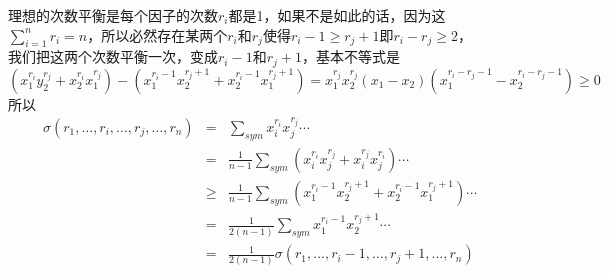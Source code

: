 \begin{example}[均值不等式]
  理想的次数平衡是每个因子的次数$r_i$都是1，如果不是如此的话，因为这$\sum_{i=1}^nr_i=n$，所以必然存在某两个$r_i$和$r_j$使得$r_i-1 \geqslant r_j+1$即$r_i - r_j \geqslant 2$，\\
  我们把这两个次数平衡一次，变成$r_i-1$和$r_j+1$，基本不等式是
  \begin{equation*}
  (x_1^{r_i}y_2^{r_j}+x_2^{r_i}x_1^{r_j})-(x_1^{r_i-1}x_2^{r_j+1}+x_2^{r_i-1}x_1^{r_j+1})=x_1^{r_j}x_2^{r_j}(x_1-x_2)(x_1^{r_i-r_j-1}-x_2^{r_i-r_j-1}) \geqslant 0
  \end{equation*}
  所以
  \begin{eqnarray*}
    \sigma(r_1,\ldots,r_i,\ldots,r_j,\ldots,r_n) & = & \sum_{sym}x_i^{r_i}x_j^{r_j}\cdots \\
 & = & \frac{1}{n-1} \sum_{sym}(x_i^{r_i}x_j^{r_j}+x_i^{r_j}x_j^{r_i})\cdots \\
 & \geqslant & \frac{1}{n-1} \sum_{sym} (x_1^{r_i-1}x_2^{r_j+1}+x_2^{r_i-1}x_1^{r_j+1})\cdots \\
                               & = & \frac{1}{2(n-1)} \sum_{sym}x_1^{r_i-1}x_2^{r_j+1}\cdots \\
    & = & \frac{1}{2(n-1)} \sigma(r_1,\ldots,r_i-1,\ldots,r_j+1,\ldots,r_n)
  \end{eqnarray*}
\end{example}

